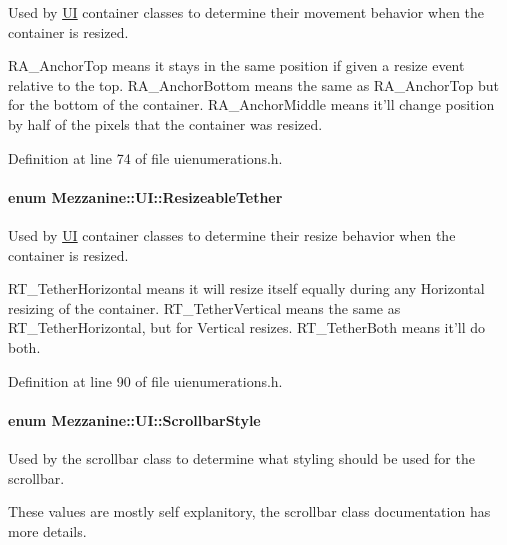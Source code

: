 Used by \hyperlink{namespaceMezzanine_1_1UI}{UI} container classes to determine their movement behavior when the container is resized. 

RA\_\-AnchorTop means it stays in the same position if given a resize event relative to the top. RA\_\-AnchorBottom means the same as RA\_\-AnchorTop but for the bottom of the container. RA\_\-AnchorMiddle means it'll change position by half of the pixels that the container was resized. 

Definition at line 74 of file uienumerations.h.

\hypertarget{namespaceMezzanine_1_1UI_a0334e290e4c9f6a5468fbe11164a17b9}{
\paragraph[{ResizeableTether}]{\setlength{\rightskip}{0pt plus 5cm}enum {\bf Mezzanine::UI::ResizeableTether}}\hfill}
\label{namespaceMezzanine_1_1UI_a0334e290e4c9f6a5468fbe11164a17b9}


Used by \hyperlink{namespaceMezzanine_1_1UI}{UI} container classes to determine their resize behavior when the container is resized. 

RT\_\-TetherHorizontal means it will resize itself equally during any Horizontal resizing of the container. RT\_\-TetherVertical means the same as RT\_\-TetherHorizontal, but for Vertical resizes. RT\_\-TetherBoth means it'll do both. 

Definition at line 90 of file uienumerations.h.

\hypertarget{namespaceMezzanine_1_1UI_a5998a9bf372a7e92605c0c461736e763}{
\paragraph[{ScrollbarStyle}]{\setlength{\rightskip}{0pt plus 5cm}enum {\bf Mezzanine::UI::ScrollbarStyle}}\hfill}
\label{namespaceMezzanine_1_1UI_a5998a9bf372a7e92605c0c461736e763}


Used by the scrollbar class to determine what styling should be used for the scrollbar. 

These values are mostly self explanitory, the scrollbar class documentation has more details. 

